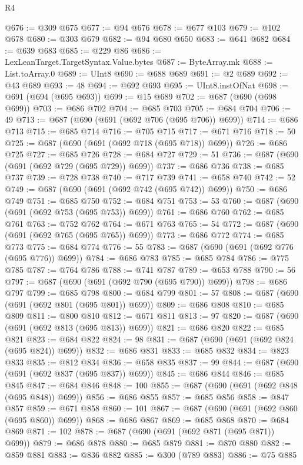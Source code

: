 \begin{lexlean}{R4}
\begin{coremodule}
@676 := @309 @675
@677 := @94 @676
@678 := @677 @103
@679 := @102 @678
@680 := @303 @679
@682 := @94 @680 @650
@683 := @641 @682
@684 := @639 @683
@685 := @229 @86
@686 := LexLeanTarget.TargetSyntax.Value.bytes
@687 := ByteArray.mk
@688 := List.toArray.{0}
@689 := UInt8
@690 := @688 @689
@691 := @2 @689
@692 := @43 @689
@693 := 48
@694 := @692 @693
@695 := UInt8.instOfNat
@698 := @691 (@694 (@695 @693))
@699 := @15 @689
@702 := @687 (@690 (@698 @699))
@703 := @686 @702
@704 := @685 @703
@705 := @684 @704
@706 := 49
@713 := @687 (@690 (@691 (@692 @706 (@695 @706)) @699))
@714 := @686 @713
@715 := @685 @714
@716 := @705 @715
@717 := @671 @716
@718 := 50
@725 := @687 (@690 (@691 (@692 @718 (@695 @718)) @699))
@726 := @686 @725
@727 := @685 @726
@728 := @684 @727
@729 := 51
@736 := @687 (@690 (@691 (@692 @729 (@695 @729)) @699))
@737 := @686 @736
@738 := @685 @737
@739 := @728 @738
@740 := @717 @739
@741 := @658 @740
@742 := 52
@749 := @687 (@690 (@691 (@692 @742 (@695 @742)) @699))
@750 := @686 @749
@751 := @685 @750
@752 := @684 @751
@753 := 53
@760 := @687 (@690 (@691 (@692 @753 (@695 @753)) @699))
@761 := @686 @760
@762 := @685 @761
@763 := @752 @762
@764 := @671 @763
@765 := 54
@772 := @687 (@690 (@691 (@692 @765 (@695 @765)) @699))
@773 := @686 @772
@774 := @685 @773
@775 := @684 @774
@776 := 55
@783 := @687 (@690 (@691 (@692 @776 (@695 @776)) @699))
@784 := @686 @783
@785 := @685 @784
@786 := @775 @785
@787 := @764 @786
@788 := @741 @787
@789 := @653 @788
@790 := 56
@797 := @687 (@690 (@691 (@692 @790 (@695 @790)) @699))
@798 := @686 @797
@799 := @685 @798
@800 := @684 @799
@801 := 57
@808 := @687 (@690 (@691 (@692 @801 (@695 @801)) @699))
@809 := @686 @808
@810 := @685 @809
@811 := @800 @810
@812 := @671 @811
@813 := 97
@820 := @687 (@690 (@691 (@692 @813 (@695 @813)) @699))
@821 := @686 @820
@822 := @685 @821
@823 := @684 @822
@824 := 98
@831 := @687 (@690 (@691 (@692 @824 (@695 @824)) @699))
@832 := @686 @831
@833 := @685 @832
@834 := @823 @833
@835 := @812 @834
@836 := @658 @835
@837 := 99
@844 := @687 (@690 (@691 (@692 @837 (@695 @837)) @699))
@845 := @686 @844
@846 := @685 @845
@847 := @684 @846
@848 := 100
@855 := @687 (@690 (@691 (@692 @848 (@695 @848)) @699))
@856 := @686 @855
@857 := @685 @856
@858 := @847 @857
@859 := @671 @858
@860 := 101
@867 := @687 (@690 (@691 (@692 @860 (@695 @860)) @699))
@868 := @686 @867
@869 := @685 @868
@870 := @684 @869
@871 := 102
@878 := @687 (@690 (@691 (@692 @871 (@695 @871)) @699))
@879 := @686 @878
@880 := @685 @879
@881 := @870 @880
@882 := @859 @881
@883 := @836 @882
@885 := @300 (@789 @883)
@886 := @75 @885

\end{coremodule}
\end{lexlean}
